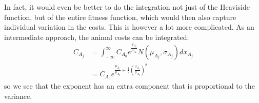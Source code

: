 \documentclass[a4paper,12pt]{article}
\begin{document}
In fact, it would even be better to do the integration not just of the Heaviside function, but of the entire fitness function, which would then also capture individual variation in the costs. This is however a lot more complicated. As an intermediate approach, the animal costs can be integrated:
\begin{align}
    C_{A_j} & = \int^\infty_{-\infty} C_{A_0} e^{\frac{x_{A_j}}{\mu_{A_0}}} N(\mu_{A_j},\sigma_{A_j})dx_{A_j}
    \label{Animal_costs} \\
    & = C_{A_0} e^{\frac{\mu_{A_j}}{\mu_{A_0}} + \frac{1}{2} \left(\frac{\sigma_{A_j}}{\mu_{A_0}}\right)^2}
\end{align}
so we see that the exponent has an extra component that is proportional to the variance.

\newpage
\end{document}
